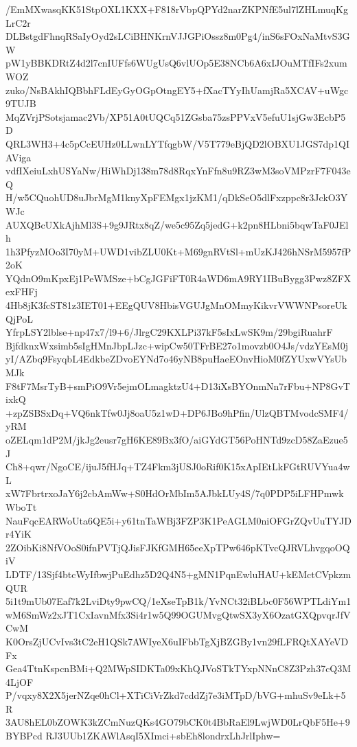 /EmMXwasqKK51StpOXL1KXX+F818rVbpQPYd2narZKPNfE5ul7lZHLmuqKgLrC2r
DLBstgdFhnqRSaIyOyd2sLCiBHNKrnVJJGPiOssz8m0Pg4/inS6sFOxNaMtvS3GW
pW1yBBKDRtZ4d2l7cnIUFfs6WUgUsQ6vlUOp5E38NCb6A6xIJOuMTfIFs2xumWOZ
zuko/NsBAkhIQBbhFLdEyGyOGpOtngEY5+fXacTYyIhUamjRa5XCAV+uWgc9TUJB
MqZVrjPSotsjamac2Vb/XP51A0tUQCq51ZGsba75zsPPVxV5efuU1sjGw3EcbP5D
QRL3WH3+4c5pCcEUHz0LLwnLYTfqgbW/V5T779eBjQD2lOBXU1JGS7dp1QIAViga
vdfIXeiuLxhUSYaNw/HiWhDj138m78d8RqxYnFfn8u9RZ3wM3soVMPzrF7F043eQ
H/w5CQuohUD8uJbrMgM1knyXpFEMgx1jzKM1/qDkSeO5dlFxzppc8r3JckO3YWJc
AUXQBcUXkAjhMl3S+9g9JRtx8qZ/we5c95Zq5jedG+k2pn8HLbni5bqwTaF0JElh
1h3PfyzMOo3I70yM+UWD1vibZLU0Kt+M69gnRVtSl+mUzKJ426hNSrM5957fP2oK
YQdnO9mKpxEj1PeWMSze+bCgJGFiFT0R4aWD6mA9RY1IBuBygg3Pwz8ZFXexFHFj
4Hb8jK3fcST81z3IET01+EEgQUV8HbisVGUJgMnOMmyKikvrVWWNPsoreUkQjPoL
YfrpLSY2lblse+np47x7/l9+6/JlrgC29KXLPi37kF5sIxLwSK9m/29bgiRuahrF
BjfdknxWxsimb5sIgHMnJbpLJzc+wipCw50TFrBE27o1movzb0O4Js/vdzYEsM0j
yI/AZbq9FsyqbL4EdkbeZDvoEYNd7o46yNB8puHaeEOnvHioM0fZYUxwVYsUbMJk
F8tF7MsrTyB+smPiO9Vr5ejmOLmagktzU4+D13iXsBYOnmNn7rFbu+NP8GvTixkQ
+zpZSBSxDq+VQ6nkTfw0Jj8oaU5z1wD+DP6JBo9hPfin/UlzQBTMvodcSMF4/yRM
oZELqm1dP2M/jkJg2eusr7gH6KE89Bx3fO/aiGYdGT56PoHNTd9zcD58ZaEzue5J
Ch8+qwr/NgoCE/ijuJ5fHJq+TZ4Fkm3jUSJ0oRif0K15xApIEtLkFGtRUVYua4wL
xW7FbrtrxoJaY6j2cbAmWw+S0HdOrMbIm5AJbkLUy4S/7q0PDP5iLFHPmwkWboTt
NauFqcEARWoUta6QE5i+y61tnTaWBj3FZP3K1PeAGLM0niOFGrZQvUuTYJDr4YiK
2ZOibKi8NfVOoS0ifnPVTjQJisFJKfGMH65eeXpTPw646pKTvcQJRVLhvgqoOQiV
LDTF/13Sjf4btcWyIfbwjPuEdhz5D2Q4N5+gMN1PqnEwluHAU+kEMctCVpkzmQUR
5i1t9mUb07Eaf7k2LviDty9pwCQ/1eXseTpB1k/YvNCt32iBLbc0F56WPTLdiYm1
wM6SmWz2xJT1CxIavnMfx3Si4r1w5Q99OGUMvgQtwSX3yX6OzatGXQpvqrJfVCwM
K0OrsZjUCvIvs3tC2eH1QSk7AWIyeX6uIFbbTgXjBZGBy1vn29fLFRQtXAYeVDFx
Gea4TtnKspcnBMi+Q2MWpSIDKTa09xKhQJVoSTkTYxpNNnC8Z3Pzh37cQ3M4LjOF
P/vqxy8X2X5jerNZqe0hCl+XTiCiVrZkd7cddZj7e3iMTpD/bVG+mhuSv9eLk+5R
3AU8hEL0bZOWK3kZCmNuzQKs4GO79bCK0t4BbRaEl9LwjWD0LrQbF5He+9BYBPcd
RJ3UUb1ZKAWlAsqI5XImci+sbEh8londrxLhJrlIphw=
